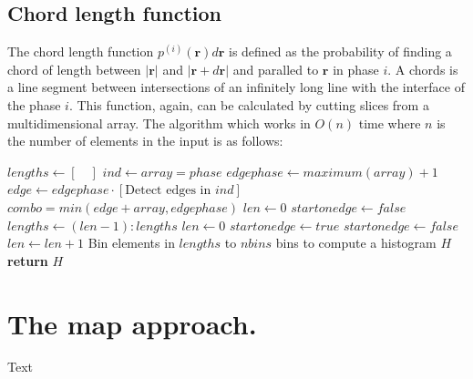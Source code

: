 \documentclass[reprint,amsmath,amssymb,aps,pre]{revtex4-1}
\begin{document}
\subsection{Chord length function}
The chord length function $p^{(i)}(\bm{r})d\bm{r}$ is defined as the probability of
finding a chord of length between $|\bm{r}|$ and $|\bm{r} + d\bm{r}|$ and
paralled to $\bm{r}$ in phase $i$. A chords is a line segment between
intersections of an infinitely long line with the interface of the phase
$i$. This function, again, can be calculated by cutting slices from a
multidimensional array. The algorithm which works in $O(n)$ time where $n$ is
the number of elements in the input is as follows:
\begin{algorithmic}[1]
    \State $lengths \gets [\quad]$
    \State $ind \gets array = phase$ 
    \State $edgephase \gets maximum(array) + 1$ 
    \State $edge \gets edgephase \cdot [\text{Detect edges in $ind$}]$ 
    \State $combo = min(edge + array, edgephase)$ 
        \State $len \gets 0$
        \State $startonedge \gets false$
              \State $lengths \gets (len-1):lengths$
            \EndIf
            \State $len \gets 0$
            \State $startonedge \gets true$
            \State $startonedge \gets false$
          \EndIf
          \State $len \gets len + 1$
        \EndFor
      \EndFor
    \EndFor
    \State Bin elements in $lengths$ to $nbins$ bins to compute a histogram $H$
    \State \textbf{return} $H$
  \EndProcedure
\end{algorithmic}

\section{The map approach.}
\label{mapsec}
Text
\end{document}

